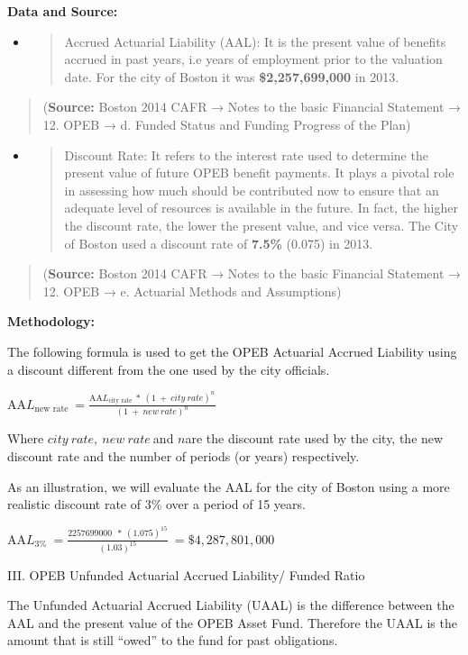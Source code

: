 \documentclass[
]{article}
\begin{document}
{\textbf{Data and Source:}}

\begin{itemize}
\item
  \begin{quote}
  Accrued Actuarial Liability (AAL): It is the present value of benefits
  accrued in past years, i.e years of employment prior to the valuation
  date. For the city of Boston it was \textbf{\$2,257,699,000} in 2013.
  \end{quote}
\end{itemize}

\begin{quote}
(\textbf{{Source:}} Boston 2014 CAFR → Notes to the basic Financial
Statement → 12. OPEB → d. Funded Status and Funding Progress of the
Plan)
\end{quote}

\begin{itemize}
\item
  \begin{quote}
  Discount Rate: It refers to the interest rate used to determine the
  present value of future OPEB benefit payments. It plays a pivotal role
  in assessing how much should be contributed now to ensure that an
  adequate level of resources is available in the future. In fact, the
  higher the discount rate, the lower the present value, and vice versa.
  The City of Boston used a discount rate of \textbf{7.5\%} (0.075) in
  2013.
  \end{quote}
\end{itemize}

\begin{quote}
(\textbf{{Source:}} Boston 2014 CAFR → Notes to the basic Financial
Statement → 12. OPEB → e. Actuarial Methods and Assumptions)
\end{quote}

\textbf{{Methodology:}}

The following formula is used to get the OPEB Actuarial Accrued
Liability using a discount different from the one used by the city
officials.

\(\text{AA}L_{\text{new\ rate}}\  = \frac{\text{AA}L_{\text{city\ rate}}\ *\ (1\  + \ city\ rate)^{n}}{(1\  + \ new\ rate)^{n}}\)

Where \(city\ rate,\ new\ rate\ \)and \(n\)are the discount rate used by
the city, the new discount rate and the number of periods (or years)
respectively.

As an illustration, we will evaluate the AAL for the city of Boston
using a more realistic discount rate of 3\% over a period of 15 years.

\(\text{AA}L_{3\%}\  = \frac{2257699000\ \ *\ (1.075)^{15}}{(1.03)^{15}}\  = \$ 4,287,801,000\ \)

III. OPEB Unfunded Actuarial Accrued Liability/ Funded Ratio

The Unfunded Actuarial Accrued Liability (UAAL) is the difference
between the AAL and the present value of the OPEB Asset Fund. Therefore
the UAAL is the amount that is still ``owed'' to the fund for past
obligations.
\end{document}
